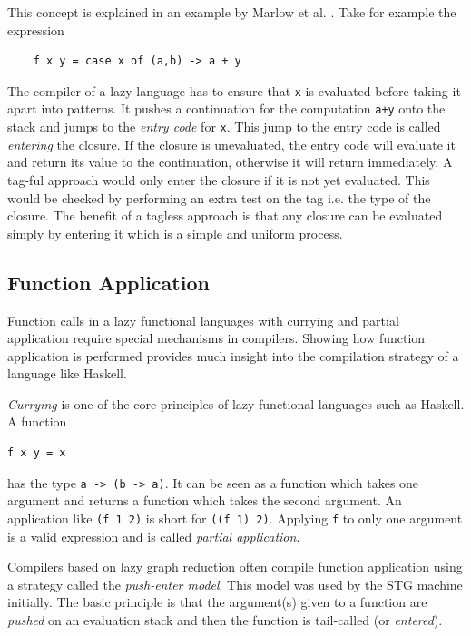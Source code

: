 \documentclass[runningheads]{llncs}
\begin{document}
This concept is explained in an example by Marlow et al. \cite{marlow2007faster}. Take for example the expression

\begin{center}
	\begin{BVerbatim}
	f x y = case x of (a,b) -> a + y
	\end{BVerbatim}
\end{center}

The compiler of a lazy language has to ensure that \texttt{x} is evaluated before taking it apart into patterns. It pushes a continuation for the computation \texttt{a+y} onto the stack and jumps to the \textit{entry code} for \texttt{x}. This jump to the entry code is called \textit{entering} the closure. If the closure is unevaluated, the entry code will evaluate it and return its value to the continuation, otherwise it will return immediately.
A tag-ful approach would only enter the closure if it is not yet evaluated. This would be checked by performing an extra test on the tag i.e. the type of the closure. The benefit of a tagless approach is that any closure can be evaluated simply by entering it which is a simple and uniform process. \cite{marlow2007faster}



\subsection{Function Application}
Function calls in a lazy functional languages with currying and partial application require special mechanisms in compilers. Showing how function application is performed provides much insight into the compilation strategy of a language like Haskell.

\textit{Currying} is one of the core principles of lazy functional languages such as Haskell. A function
\begin{center}
\begin{BVerbatim}
f x y = x
\end{BVerbatim}
\end{center}
has the type \texttt{a -> (b -> a)}. It can be seen as a function which takes one argument and returns a function which takes the second argument. An application like \texttt{(f 1 2)} is short for \texttt{((f 1) 2)}. Applying \texttt{f} to only one argument is a valid expression and is called \textit{partial application}.

Compilers based on lazy graph reduction often compile function application using a strategy called the \textit{push-enter model}. This model was used by the STG machine initially. The basic principle is that the argument(s) given to a function are \textit{pushed} on an evaluation stack and then the function is tail-called (or \textit{entered})\cite{jones1992implementing}.
\end{document}
